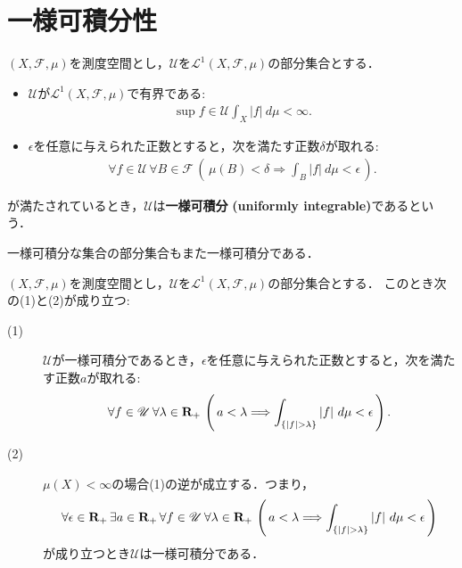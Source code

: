 \section{一様可積分性}
	\begin{screen}
		\begin{dfn}[一様可積分]
			$(X,\mathscr{F},\mu)$を測度空間とし，$\mathscr{U}$を$\mathscr{L}^1(X,\mathscr{F},\mu)$の部分集合とする．
			\begin{itemize}
				\item $\mathscr{U}$が$\mathscr{L}^1(X,\mathscr{F},\mu)$で有界である:
					\begin{align}
						\sup{f \in \mathscr{U}}\int_X|f|\ d\mu < \infty.
					\end{align}
				
				\item $\epsilon$を任意に与えられた正数とすると，次を満たす正数$\delta$が取れる:
					\begin{align}
						\forall f \in \mathscr{U}\, \forall B \in \mathscr{F}\, \left(\, \mu(B) < \delta
						\Longrightarrow \int_B |f|\ d\mu < \epsilon\, \right).
					\end{align}
			\end{itemize}
			が満たされているとき，$\mathscr{U}$は{\bf 一様可積分}
			{\bf (uniformly integrable)}であるという．
		\end{dfn}
	\end{screen}
	
	一様可積分な集合の部分集合もまた一様可積分である．
	
	\begin{screen}
	\begin{thm}[一様可積分性の同値条件]\label{thm:appendix_uniform_integrability_equivalence}
		$(X,\mathscr{F},\mu)$を測度空間とし，$\mathscr{U}$を$\mathscr{L}^1(X,\mathscr{F},\mu)$の部分集合とする．
		このとき次の(1)と(2)が成り立つ:
		\begin{description}
			\item[(1)] $\mathscr{U}$が一様可積分であるとき，$\epsilon$を任意に与えられた正数とすると，次を満たす正数$a$が取れる:
				\begin{align}
					\forall f \in \mathscr{U}\, \forall \lambda \in \mathbf{R}_+\,
					\left(\, a < \lambda \Longrightarrow \int_{\{|f| > \lambda\}} |f|\ d\mu < \epsilon\, \right).
				\end{align}
			
			\item[(2)] $\mu(X) < \infty$の場合(1)の逆が成立する．つまり，
				\begin{align}
					\forall \epsilon \in \mathbf{R}_+\, \exists a \in \mathbf{R}_+\, 
					\forall f \in \mathscr{U}\, \forall \lambda \in \mathbf{R}_+\,
					\left(\, a < \lambda \Longrightarrow \int_{\{|f| > \lambda\}} |f|\ d\mu < \epsilon\, \right)
				\end{align}
				が成り立つとき$\mathscr{U}$は一様可積分である．
		\end{description}
	\end{thm}
	\end{screen}
	
